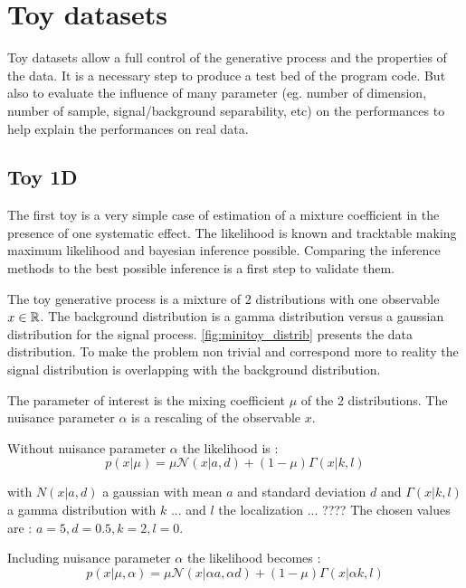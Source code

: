 \section{Toy datasets} %
\label{sec:toy_datasets}


Toy datasets allow a full control of the generative process and the properties of the data.
It is a necessary step to produce a test bed of the program code.
But also to evaluate the influence of many parameter (eg. number of dimension, number of sample, signal/background separability, etc) on the performances to help explain the performances on real data.






\subsection{Toy 1D} %
\label{sub:toy_1d}



The first toy is a very simple case of estimation of a mixture coefficient in the presence of one systematic effect.
The likelihood is known and tracktable making maximum likelihood and bayesian inference possible.
Comparing the inference methods to the best possible inference is a first step to validate them.


The toy generative process is a mixture of 2 distributions with one observable $x \in \mathbb{R}$.
The background distribution is a gamma distribution versus a gaussian distribution for the signal process.
\autoref{fig:minitoy_distrib} presents the data distribution.
To make the problem non trivial and correspond more to reality the signal distribution is overlapping with the background distribution.

The parameter of interest is the mixing coefficient $\mu$ of the 2 distributions.
The nuisance parameter $\alpha$ is a rescaling of the observable $x$.

Without nuisance parameter $\alpha$ the likelihood is :
$$
    p(x | \mu) = \mu \mathcal N(x|a, d) + (1-\mu) \Gamma(x|k, l)
$$

with $N(x|a, d)$ a gaussian with mean $a$ and standard deviation $d$ and $\Gamma(x|k, l)$ a gamma distribution with $k$ ... and $l$ the localization  ... ????
The chosen values are : $a = 5, d=0.5, k=2, l=0$.


Including nuisance parameter $\alpha$ the likelihood becomes :
$$
    p(x | \mu, \alpha) = \mu \mathcal N(x|\alpha a, \alpha d) + (1-\mu) \Gamma(x|\alpha k, l)
$$

